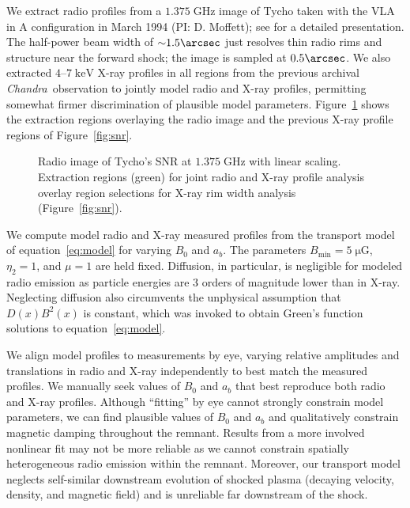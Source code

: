 \documentclass[manuscript]{aastex}  %
\newcommand*{\mt}{\mathrm}
\newcommand*{\unit}[1]{\;\mt{#1}}  %
\newcommand*{\abt}{\mathord{\sim}} %
\newcommand*{\Chandra}{\textit{Chandra}\ }
\newcommand*{\muG}{\unit{\mu G}}
\begin{document}
We extract radio profiles from a $1.375 \unit{GHz}$ image of Tycho taken
with the VLA in A configuration in March 1994 (PI: D. Moffett); see
\citet{reynoso1997} for a detailed presentation.
The half-power beam width of $\abt 1.5\arcsec$ just resolves thin radio rims
and structure near the forward shock; the image is sampled at $0.5\arcsec$.
We also extracted $4$--$7 \unit{keV}$ X-ray profiles in all regions from the
previous archival \Chandra observation to jointly model radio and X-ray
profiles, permitting somewhat firmer discrimination of plausible model
parameters.  Figure~\ref{fig:radio-snr} shows the extraction regions overlaying
the radio image and the previous X-ray profile regions of Figure~\ref{fig:snr}.

\begin{figure}
    \centering
    \iftoggle{manuscript}{ %
        \texttt{[image: figures/radio-snr-inv.png]}
    }{
        \plotone{figures/radio-snr-inv.png}
    }
    \caption{Radio image of Tycho's SNR at $1.375 \unit{GHz}$ with linear
    scaling.  Extraction regions (green) for joint radio and X-ray profile
    analysis overlay region selections for X-ray rim width analysis
    (Figure~\ref{fig:snr}). \label{fig:radio-snr}}
\end{figure}

We compute model radio and X-ray measured profiles from the transport model of
equation~\eqref{eq:model} for varying $B_0$ and $a_b$.  The parameters
$B_{\mt{min}} = 5 \muG$, $\eta_2 = 1$, and $\mu = 1$ are held fixed.
Diffusion, in particular, is negligible for modeled radio emission as particle
energies are 3 orders of magnitude lower than in X-ray.  Neglecting diffusion
also circumvents the unphysical assumption that $D(x) B^2(x)$ is constant,
which was invoked to obtain Green's function solutions to
equation~\eqref{eq:model}.

We align model profiles to measurements by eye, varying relative amplitudes and
translations in radio and X-ray independently to best match the measured
profiles.  We manually seek values of $B_0$ and $a_b$ that best reproduce both
radio and X-ray profiles.  Although ``fitting'' by eye cannot strongly
constrain model parameters, we can find plausible values of $B_0$ and $a_b$
and qualitatively constrain magnetic damping throughout the remnant.  Results
from a more involved nonlinear fit may not be more reliable as we cannot
constrain spatially heterogeneous radio emission within the remnant.  Moreover,
our transport model neglects self-similar downstream evolution of shocked
plasma (decaying velocity, density, and magnetic field) and is unreliable far
downstream of the shock.
\end{document}
